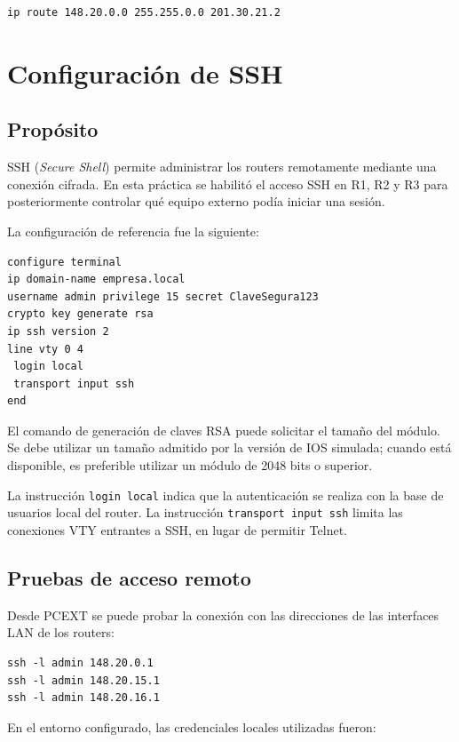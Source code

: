 \documentclass[12pt,a4paper]{article}
\begin{document}
\begin{lstlisting}
ip route 148.20.0.0 255.255.0.0 201.30.21.2
\end{lstlisting}

\section{Configuración de SSH}

\subsection{Propósito}

SSH (\textit{Secure Shell}) permite administrar los routers
remotamente mediante una conexión cifrada. En esta práctica se
habilitó el acceso SSH en R1, R2 y R3 para posteriormente controlar
qué equipo externo podía iniciar una sesión.

La configuración de referencia fue la siguiente:

\begin{lstlisting}
configure terminal
ip domain-name empresa.local
username admin privilege 15 secret ClaveSegura123
crypto key generate rsa
ip ssh version 2
line vty 0 4
 login local
 transport input ssh
end
\end{lstlisting}

El comando de generación de claves RSA puede solicitar el tamaño
del módulo. Se debe utilizar un tamaño admitido por la versión
de IOS simulada; cuando está disponible, es preferible utilizar
un módulo de 2048 bits o superior.

La instrucción \texttt{login local} indica que la autenticación
se realiza con la base de usuarios local del router. La instrucción
\texttt{transport input ssh} limita las conexiones VTY entrantes
a SSH, en lugar de permitir Telnet.

\subsection{Pruebas de acceso remoto}

Desde PCEXT se puede probar la conexión con las direcciones
de las interfaces LAN de los routers:

\begin{lstlisting}
ssh -l admin 148.20.0.1
ssh -l admin 148.20.15.1
ssh -l admin 148.20.16.1
\end{lstlisting}

En el entorno configurado, las credenciales locales utilizadas
fueron:
\end{document}
